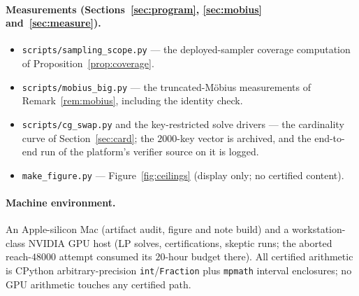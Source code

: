 \documentclass[11pt]{article}
\theoremstyle{remark}
\begin{document}
\paragraph{Measurements (Sections~\ref{sec:program},
\ref{sec:mobius} and~\ref{sec:measure}).}
\begin{itemize}
\item \texttt{scripts/sampling\_scope.py} --- the deployed-sampler
coverage computation of Proposition~\ref{prop:coverage}.
\item \texttt{scripts/mobius\_big.py} --- the truncated-M\"obius
measurements of Remark~\ref{rem:mobius}, including the identity check.
\item \texttt{scripts/cg\_swap.py} and the key-restricted solve drivers
--- the cardinality curve of Section~\ref{sec:card}; the $2000$-key vector
is archived, and the end-to-end run of the platform's verifier source on
it is logged.
\item \texttt{make\_figure.py} --- Figure~\ref{fig:ceilings} (display
only; no certified content).
\end{itemize}

\paragraph{Machine environment.} An Apple-silicon Mac (artifact audit,
figure and note build) and a workstation-class NVIDIA GPU host (LP solves,
certifications, skeptic runs; the aborted reach-$48000$ attempt consumed
its $20$-hour budget there). All certified arithmetic is CPython
arbitrary-precision \texttt{int}/\texttt{Fraction} plus \texttt{mpmath}
interval enclosures; no GPU arithmetic touches any certified path.
\end{document}
